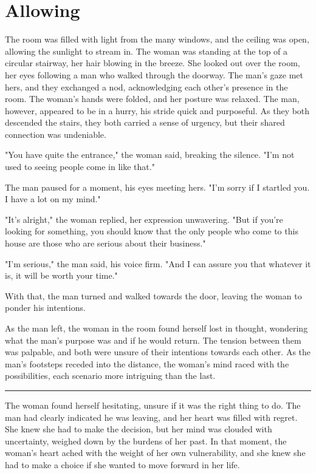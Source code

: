 \documentclass[smalldemyvopaper,11pt,twoside,onecolumn,openright,extrafontsizes]{memoir}
\begin{document}
\chapter{Allowing}
The room was filled with light from the many windows, and the ceiling was open, allowing the sunlight to stream in. The woman was standing at the top of a circular stairway, her hair blowing in the breeze. She looked out over the room, her eyes following a man who walked through the doorway. The man's gaze met hers, and they exchanged a nod, acknowledging each other's presence in the room. The woman's hands were folded, and her posture was relaxed. The man, however, appeared to be in a hurry, his stride quick and purposeful. As they both descended the stairs, they both carried a sense of urgency, but their shared connection was undeniable.\par
"You have quite the entrance," the woman said, breaking the silence. "I'm not used to seeing people come in like that."\par
The man paused for a moment, his eyes meeting hers. "I'm sorry if I startled you. I have a lot on my mind."\par
"It's alright," the woman replied, her expression unwavering. "But if you're looking for something, you should know that the only people who come to this house are those who are serious about their business."\par
"I'm serious," the man said, his voice firm. "And I can assure you that whatever it is, it will be worth your time."\par
With that, the man turned and walked towards the door, leaving the woman to ponder his intentions.\par
As the man left, the woman in the room found herself lost in thought, wondering what the man's purpose was and if he would return. The tension between them was palpable, and both were unsure of their intentions towards each other. As the man's footsteps receded into the distance, the woman's mind raced with the possibilities, each scenario more intriguing than the last.\par
\fancybreak{* * *}
The woman found herself hesitating, unsure if it was the right thing to do. The man had clearly indicated he was leaving, and her heart was filled with regret. She knew she had to make the decision, but her mind was clouded with uncertainty, weighed down by the burdens of her past. In that moment, the woman's heart ached with the weight of her own vulnerability, and she knew she had to make a choice if she wanted to move forward in her life.\par
\end{document}
